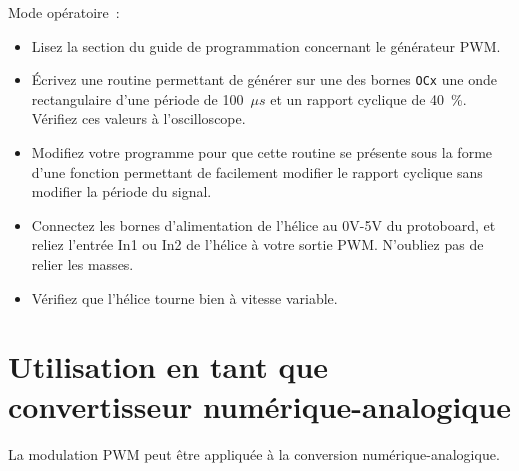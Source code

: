 \documentclass[11pt,a4paper]{article}
\theoremstyle{definition}%
\begin{document}
Mode opératoire~:
\begin{itemize}
	\item Lisez la section du guide de programmation concernant le générateur PWM.
	\item Écrivez une routine permettant de générer sur une des bornes \texttt{OCx} une onde rectangulaire d’une période de 100~$\mu s$ et un rapport cyclique de 40~\%.
	Vérifiez ces valeurs à l’oscilloscope.
	\item Modifiez votre programme pour que cette routine se présente sous la forme d’une fonction permettant de facilement modifier le rapport cyclique sans modifier la période du signal.
	\item Connectez les bornes d’alimentation de l’hélice au 0V-5V du protoboard, et reliez l’entrée In1 ou In2 de l’hélice à votre sortie PWM.
	N’oubliez pas de relier les masses.
	\item Vérifiez que l’hélice tourne bien à vitesse variable.
\end{itemize}







\section{Utilisation en tant que convertisseur numérique-analogique}
La modulation PWM peut être appliquée à la conversion numérique-analogique.
\end{document}
